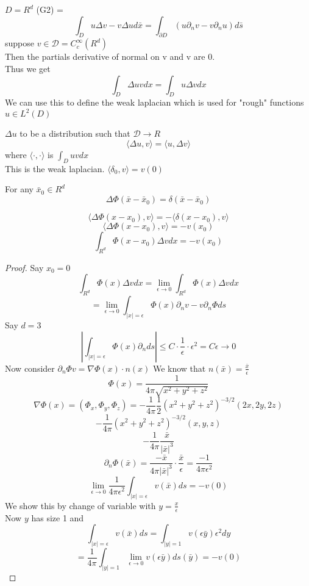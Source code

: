 \documentclass[answers,12pt,addpoints]{exam}
\begin{document}
\begin{definition}
    $D = R^d$
    (G2) = 
    $$ \int_D u \Delta v - v \Delta u d\bar{x} = \int_{\partial D} (u \partial_n v - v \partial_n u) d\bar{s}$$
    suppose 
    $v \in \mathcal{D} = C_c^{\infty}(R^d)$\\
    Then the partials derivative of normal on v and v are 0.\\
    Thus we get
    $$ \int_D \Delta u v dx = \int_D u \Delta v dx$$
    We can use this to define the weak laplacian which is used for "rough" functions $u \in L^2(D)$
\end{definition}
\begin{definition}
    $ \Delta u$ to be a distribution such that $\mathcal{D} \to R$\\
    $$ \langle \Delta u, v \rangle = \langle u, \Delta v \rangle$$
    where $\langle \cdot, \cdot \rangle$ is $\int_D u v dx$\\
    This is the weak laplacian.
    $\langle \delta_0 , v \rangle = v(0)$
\end{definition}
\begin{lemma}
    For any $\bar{x}_0 \in R^d$
    $$ \Delta \Phi(\bar{x} - \bar{x}_0) = \delta(\bar{x} - \bar{x}_0)$$
\end{lemma}
\begin{definition}
    $$\langle \Delta \Phi(x-x_0), v\rangle = - \langle \delta(x-x_0), v \rangle$$
    $$\langle \Delta \Phi(x-x_0), v\rangle = - v(x_0)$$
    $$ \int_{R^d} \Phi(x-x_0) \Delta v dx = - v(x_0)$$
    \begin{proof}
        Say $x_0 = 0$
        $$ \int_{R^d} \Phi(x) \Delta v dx = \lim_{\epsilon \to 0} \int_{R^d} \Phi(x) \Delta v dx$$
        $$ = \lim_{\epsilon \to 0} \int_{|x| = \epsilon} \Phi(x) \partial_n v - v \partial_n \Phi ds$$ 
        Say $d =3$\\
        $$ | \int_{|x| = \epsilon} \Phi(x) \partial_n ds| \leq C \cdot \frac{1}{\epsilon} \cdot \epsilon^2 = C \epsilon \to 0$$
        Now consider $\partial_n \Phi v = \nabla \Phi(x) \cdot n(x) $
        We know that $n(\bar{x}) = \frac{\bar{x}}{\epsilon}$\\
        $$ \Phi(x) = \frac{1}{4\pi \sqrt{x^2 +y^2 + z^2}}$$
        $$ \nabla \Phi(x) = (\Phi_x, \Phi_y, \Phi_z) = - \frac{1}{4\pi} \frac{1}{2} (x^2 + y^2 + z^2)^{-3/2} ( 2x, 2y, 2z)$$ 
        $$ - \frac{1}{4\pi} (x^2 + y^2 + z^2)^{-3/2} (x, y, z)$$
        $$ - \frac{1}{4\pi} \frac{\bar{x}}{|\bar{x}|^3}$$
        $$ \partial_n \Phi(\bar{x}) = \frac{-\bar{x}}{4 \pi |\bar{x}|^3} \cdot \frac{\bar{x}}{\epsilon} = \frac{-1}{4\pi \epsilon^2}$$
        $$ \lim_{\epsilon \to 0} \frac{1}{4\pi \epsilon^2} \int_{|x| = \epsilon} v(\bar{x}) ds = - v(0)$$
        We show this by change of variable with $y = \frac{x}{\epsilon}$\\
        Now $y$ has size 1 and 
        $$ \int_{|x| = \epsilon} v(\bar{x}) ds = \int_{|y| = 1} v(\epsilon \bar{y}) \epsilon^2 dy $$
        $$ = \frac{1}{4\pi} \int_{|y| = 1} \lim_{\epsilon \to 0} v(\epsilon \bar{y}) ds(\bar{y}) = - v(0)$$
    \end{proof}
\end{definition}
\end{document}
